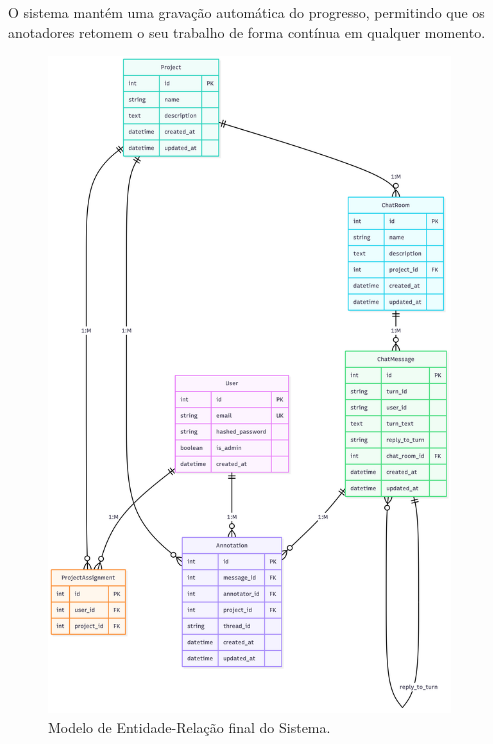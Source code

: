 O sistema mantém uma gravação automática do progresso, permitindo que os anotadores retomem o seu trabalho de forma contínua em qualquer momento.


\begin{figure}[p]
    \centering
    \includegraphics[width=0.95\textwidth,height=0.95\textheight,keepaspectratio]{images/3-modelo-de-entidade-relacao-final-do-sistema.png}
    \caption{Modelo de Entidade-Relação final do Sistema.}
    \label{fig:modelo-er}
\end{figure}

